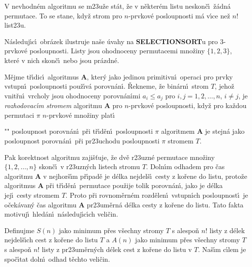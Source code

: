 \flushpar V nevhodn\'em algoritmu se m\accent23u\v ze st\'at, \v ze 
v n\v ekter\'em listu neskon\v c\'\i\ \v z\'adn\'a permutace. To se 
stane, kdy\v z strom pro $n$-prvkov\'e posloupnosti m\'a v\'\i ce 
ne\v z $n!$ list\accent23u.
\medskip

\flushpar N\'asleduj\'\i c\'\i\ obr\'azek ilustruje na\v se \'uvahy na 
{\bf SELECTIONSORT}u pro $3$-prvkov\'e posloupnosti. Listy jsou 
ohodnoceny permutacemi mno\v ziny $\{1,2,3\}$, kter\'e v nich 
skon\v c\'\i\ nebo jsou pr\'azdn\'e. 
\midinsert
\centerline{}
\endcaption
\endinsert
\newpage

M\v ejme t\v r\'\i dic\'\i\ algoritmus {\bf A}, kter\'y 
jako jedinou pri\-mitivn\'\i\ operaci pro prvky vstupn\'\i\ 
posloupnosti pou\v z\'\i v\'a porov\-n\'an\'\i . \v Rekneme, \v ze 
bin\'arn\'\i\ strom $T$, jeho\v z vnit\v rn\'\i\ vrcholy jsou ohodnoceny 
porovn\'an\'\i mi  $a_i\le a_j$ pro $i,j=1,2,\dots,n$, $i\ne j$, je 
\emph{rozhodovac\'\i m} \emph{stromem} algoritmu {\bf A} pro 
$n$-prvkov\'e posloupnosti, kdy\v z pro ka\v zdou permutaci $\pi$
$n$-prvkov\'e mno\v ziny plat\'\i\ 
\roster
\item"{}"
posloupnost porovn\'an\'\i\ p\v ri t\v r\'\i d\v en\'\i\ posloupnosti $
\pi$ 
algoritmem {\bf A} je stejn\'a jako posloupnost porovn\'an\'\i\ p\v ri 
pr\accent23uchodu posloupnosti $\pi$ stromem $T$.
\endroster
\enddefinition
\medskip

\flushpar Pak korektnost algoritmu zaji\v s\v tuje, \v ze dv\v e r\accent23uzn\'e 
permutace mno\v ziny $\{1,2,\dots,n\}$ skon\v c\'\i\ v 
r\accent23uzn\'ych listech stromu $T$. Dol\-n\'\i m odhadem pro 
\v cas algoritmu {\bf A} v nej\-hor\v s\'\i m p\v r\'\i pad\v e je d\'elka nejdel\v s\'\i\ 
cesty z ko\v rene do listu, proto\v ze algoritmus {\bf A} p\v ri 
t\v r\'\i d\v en\'\i\ permutace pou\v zije tolik porovn\'an\'\i , jako je d\'elka 
jej\'\i\ cesty stromem $T$. Proto p\v ri rovnom\v ern\'em 
rozd\v elen\'\i\ vstupn\'\i ch po\-sloupnost\'\i\ je o\v cek\'avan\'y \v cas 
algoritmu {\bf A} pr\accent23um\v ern\'a d\'elka cesty z ko\v rene do 
listu. Tato fakta motivuj\'\i\ hled\'an\'\i\ n\'asleduj\'\i c\'\i ch veli\-\v cin. 
\medskip

\flushpar Definujme\newline 
$S(n)$ jako minimum p\v res v\v sechny stromy $T$ s alespo\v n $n
!$ listy z 
d\'elek nejdel\v s\'\i ch cest z ko\v rene 
do listu $T$ a\newline 
$A(n)$ jako minimum p\v res v\v sechny stromy $T$ s alespo\v n $n
!$ listy z
pr\accent23um\v ern\'ych d\'elek cest z ko\v rene do listu v $T$.\newline 
Na\v s\'\i m c\'\i lem je spo\v c\'\i tat doln\'\i\ odhad t\v echto veli\v cin.
\medskip

